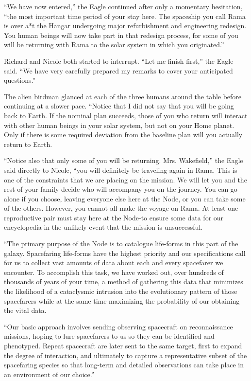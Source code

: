\documentclass[]{article}
\begin{document}
{“We have now entered,” the Eagle continued after only a momentary hesitation, “the most important time period of your stay here.  The spaceship you call Rama is over a*t the Hangar undergoing major refurbishment and engineering redesign.  You human beings will now take part in that redesign process, for some of you will be returning with Rama to the solar system in which you originated.”

Richard and Nicole both started to interrupt.  “Let me finish first,” the Eagle said.  “We have very carefully prepared my remarks to cover your anticipated questions.”

The alien birdman glanced at each of the three humans around the table before continuing at a slower pace.  “Notice that I did not say that you will be going back to Earth.  If the nominal plan succeeds, those of you who return will interact with other human beings in your solar system, but not on your Home planet.  Only if there is some required deviation from the baseline plan will you actually return to Earth.

“Notice also that only some of you will be returning.  Mrs.  Wakefield,” the Eagle said directly to Nicole, “you will definitely be traveling again in Rama.  This is one of the constraints that we are placing on the mission.  We will let you and the rest of your family decide who will accompany you on the journey.  You can go alone if you choose, leaving everyone else here at the Node, or you can take some of the others.  However, you cannot all make the voyage on Rama.  At least one reproductive pair must stay here at the Node-to ensure some data for our encyclopedia in the unlikely event that the mission is unsuccessful.

“The primary purpose of the Node is to catalogue life-forms in this part of the galaxy.  Spacefaring life-forms have the highest priority and our specifications call for us to collect vast amounts of data about each and every spacefarer we encounter.  To accomplish this task, we have worked out, over hundreds of thousands of years of your time, a method of gathering this data that minimizes the likelihood of a cataclysmic intrusion into the evolutionary pattern of those spacefarers while at the same time maximizing the probability of our obtaining the vital data.

“Our basic approach involves sending observing spacecraft on reconnaissance missions, hoping to lure spacefarers to us so they can be identified and phenotyped.  Repeat spacecraft are later sent to the same target, first to expand the degree of interaction, and ultimately to capture a representative subset of the spacefaring species so that long-term and detailed observations can take place in an environment of our choice.”

}
\end{document}
